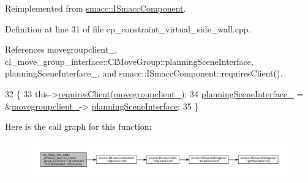 Reimplemented from \hyperlink{classsmacc_1_1ISmaccComponent_ae6f71d008db12553912e9436184b9e65}{smacc\+::\+I\+Smacc\+Component}.



Definition at line 31 of file cp\+\_\+constraint\+\_\+virtual\+\_\+side\+\_\+wall.\+cpp.



References movegroupclient\+\_\+, cl\+\_\+move\+\_\+group\+\_\+interface\+::\+Cl\+Move\+Group\+::planning\+Scene\+Interface, planning\+Scene\+Interface\+\_\+, and smacc\+::\+I\+Smacc\+Component\+::requires\+Client().


\begin{DoxyCode}
32         \{
33             this->\hyperlink{classsmacc_1_1ISmaccComponent_a36c085d906fbae0fcaee817aaeafebf4}{requiresClient}(\hyperlink{classsm__fetch__two__table__whiskey__pour_1_1cl__move__group__interface_1_1CpConstraintVirtualSideWall_a3c89329c38352fd0fa6a75c3c0a69673}{movegroupclient\_});
34             \hyperlink{classsm__fetch__two__table__whiskey__pour_1_1cl__move__group__interface_1_1CpConstraintVirtualSideWall_abc3ab168e5ab2388bf9e0107cc791387}{planningSceneInterface\_} = &\hyperlink{classsm__fetch__two__table__whiskey__pour_1_1cl__move__group__interface_1_1CpConstraintVirtualSideWall_a3c89329c38352fd0fa6a75c3c0a69673}{movegroupclient\_}->
      \hyperlink{classcl__move__group__interface_1_1ClMoveGroup_a11bfab580f36e2ad32c9b37d6f58f44c}{planningSceneInterface};
35         \}
\end{DoxyCode}
Here is the call graph for this function\+:
\nopagebreak
\begin{figure}[H]
\begin{center}
\leavevmode
\includegraphics[width=350pt]{classsm__fetch__two__table__whiskey__pour_1_1cl__move__group__interface_1_1CpConstraintVirtualSideWall_a7f052ec290f7cb7ee2b6a288b221b9a2_cgraph}
\end{center}
\end{figure}
\mbox{\label{classsm__fetch__two__table__whiskey__pour_1_1cl__move__group__interface_1_1CpConstraintVirtualSideWall_a2295eef9dd270ab1e9d2b0837f103352}} 
